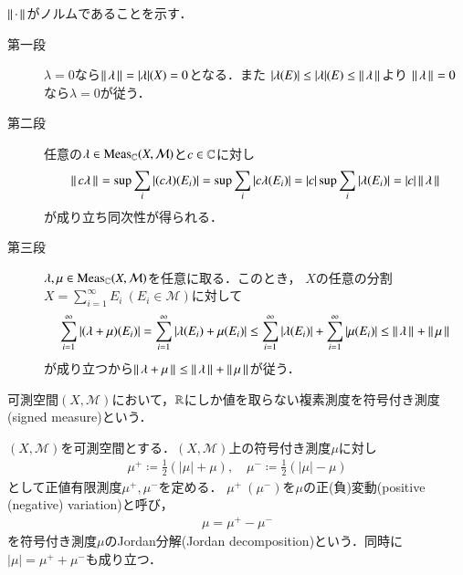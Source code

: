 	\begin{prf}\mbox{}
		$\left\|\, \cdot\, \right\|_{}$がノルムであることを示す．
		\begin{description}
			\item[第一段]
				$\lambda = 0$なら$\left\|\, \lambda\, \right\|_{} = |\lambda|(X) = 0$となる．また
				$|\lambda(E)| \leq |\lambda|(E) \leq \left\|\, \lambda\, \right\|_{}$より
				$\left\|\, \lambda\, \right\|_{} = 0$なら$\lambda=0$が従う．
			
			\item[第二段]
				任意の$\lambda \in \mathrm{Meas}_{\mathbb{C}}(X,\mathcal{M})$と$c \in \mathbb{C}$に対し
				\begin{align}
					\left\|\, c\lambda\, \right\|_{} = \operatorname*{sup}_{} \sum_{i}|(c\lambda)(E_i)| = \operatorname*{sup}_{} \sum_{i}|c\lambda(E_i)| = |c|\operatorname*{sup}_{} \sum_{i}|\lambda(E_i)| = |c|\left\|\, \lambda\, \right\|_{}
				\end{align}
				が成り立ち同次性が得られる．
			
			\item[第三段]
				$\lambda,\mu \in \mathrm{Meas}_{\mathbb{C}}(X,\mathcal{M})$を任意に取る．このとき，
				$X$の任意の分割$X = \sum_{i=1}^\infty E_i\ (E_i \in \mathcal{M})$に対して
				\begin{align}
					\sum_{i=1}^\infty |(\lambda + \mu)(E_i)| 
					= \sum_{i=1}^\infty |\lambda(E_i) + \mu(E_i)| 
					\leq \sum_{i=1}^\infty |\lambda(E_i)| + \sum_{i=1}^\infty |\mu(E_i)| \leq \left\|\, \lambda\, \right\|_{} + \left\|\, \mu\, \right\|_{}
				\end{align}
				が成り立つから$\left\|\, \lambda + \mu\, \right\|_{} \leq \left\|\, \lambda\, \right\|_{} + \left\|\, \mu\, \right\|_{}$が従う．
				\QED
		\end{description}
	\end{prf}
	
	可測空間$(X,\mathcal{M})$において，$\mathbb{R}$にしか値を取らない複素測度を符号付き測度(signed measure)という．
	\begin{screen}
		\begin{dfn}
			$(X,\mathcal{M})$を可測空間とする．$(X,\mathcal{M})$上の符号付き測度$\mu$に対し
			\begin{align}
				\mu^+ \coloneqq \frac{1}{2}(|\mu| + \mu) , \quad \mu^- \coloneqq \frac{1}{2}(|\mu| - \mu)
			\end{align}
			として正値有限測度$\mu^+,\mu^-$を定める．
			$\mu^+\ (\mu^-)$を$\mu$の正(負)変動(positive (negative) variation)と呼び，
			\begin{align}
				\mu = \mu^+ - \mu^-
			\end{align}
			を符号付き測度$\mu$のJordan分解(Jordan decomposition)という．同時に$|\mu| = \mu^+ + \mu^-$も成り立つ．
		\end{dfn}
	\end{screen}
	
